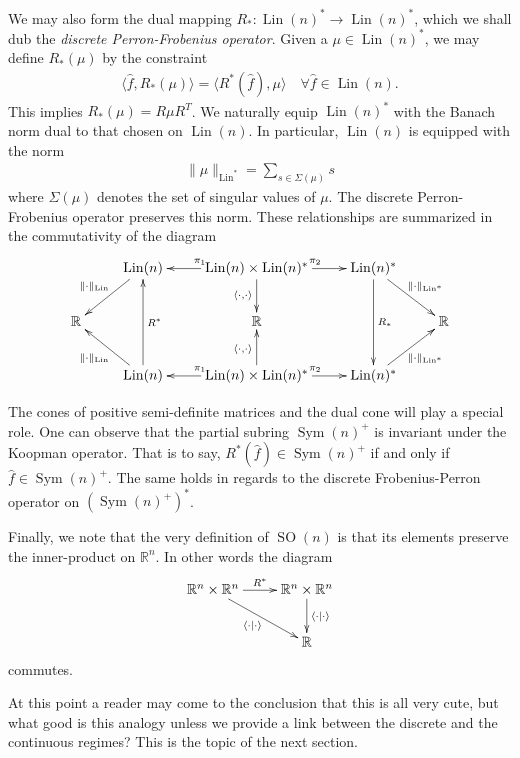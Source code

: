 \documentclass[12pt]{amsart}
\newcommand{\R}{\ensuremath{\mathbb{R}}}
\DeclareMathOperator{\SO}{SO}
\DeclareMathOperator{\Sym}{Sym}
\DeclareMathOperator{\Lin}{Lin}
\begin{document}
We may also form the dual mapping $R_*: \Lin(n)^* \to \Lin(n)^*$,
which we shall dub the \emph{discrete Perron-Frobenius operator}.
Given a $\mu \in \Lin(n)^*$, we may define $R_*(\mu)$ by the constraint
\begin{align*}
	\langle \hat{f} , R_*(\mu) \rangle = \langle R^*(\hat{f}) , \mu \rangle \quad \forall \hat{f} \in \Lin(n).
\end{align*}
This implies $R_*(\mu) = R \mu R^T$.
We naturally equip $\Lin(n)^*$ with the Banach norm dual to that chosen on $\Lin(n)$.
In particular, $\Lin(n)$ is  equipped with the norm
\begin{align*}
	\| \mu \|_{\Lin^*} = \sum_{s \in \Sigma(\mu) } s
\end{align*}
where $\Sigma(\mu)$ denotes the set of singular values of $\mu$.
The discrete Perron-Frobenius operator preserves this norm.
These relationships are summarized in the commutativity of the diagram
\begin{equation*}
	\xymatrix{
		& \ar[dl]_{\| \cdot \|_{\Lin}} \Lin(n) & \ar[l]_{\pi_1} \Lin(n)\times \Lin(n)^* \ar[d]_{\langle \cdot , \cdot \rangle} \ar[r]^{\pi_2} & \Lin(n)^*   \ar[dd]^{R_*} \ar[dr]^{\| \cdot \|_{\Lin^*}}& \\
		\mathbb{R} && \mathbb{R} && \mathbb{R} \\
		& \ar[ul]^{\| \cdot \|_{\Lin}} \Lin(n) \ar[uu]_{R^*} & \ar[l]_{\pi_1} \Lin(n)\times \Lin(n)^* \ar[u]^{\langle \cdot , \cdot \rangle} \ar[r]^{\pi_2} & \Lin(n)^* \ar[ur]_{\| \cdot \|_{\Lin^*}} &	
	}
\end{equation*}

The cones of positive semi-definite matrices and the dual cone will play a special role.
One can observe that the partial subring $\Sym(n)^+$ is invariant under the Koopman operator.
That is to say, $R^*(\hat{f}) \in \Sym(n)^+$ if and only if $\hat{f} \in \Sym(n)^+$.
The same holds in regards to the discrete Frobenius-Perron operator on $(\Sym(n)^+)^*$.

Finally, we note that the very definition of $\SO(n)$ is that its elements preserve the inner-product on $\R^n$.
In other words the diagram
\begin{equation*}
	\xymatrix{
		\R^n \times \R^n \ar[dr]_{\langle \cdot \mid \cdot \rangle} \ar[r]^{R^*} & \R^n \times \R^n \ar[d]^{\langle \cdot \mid \cdot \rangle} \\
		&\mathbb{R}
	}
\end{equation*}
commutes.

At this point a reader may come to the conclusion that this is all very cute, but
what good is this analogy unless we provide a link between the discrete and the continuous regimes?
This is the topic of the next section.
\end{document}
